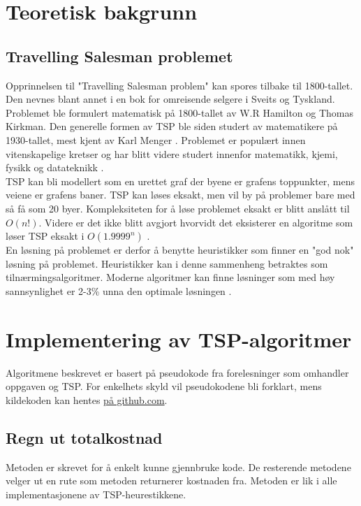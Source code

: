 \documentclass[12pt]{article}
\begin{document}
	
\section{Teoretisk bakgrunn}
\subsection{Travelling Salesman problemet}
		Opprinnelsen til "Travelling Salesman problem" kan spores tilbake til 1800-tallet. 
		Den nevnes blant annet i en bok for omreisende selgere i Sveits og Tyskland. Problemet ble formulert matematisk på 1800-tallet av W.R Hamilton og Thomas Kirkman. 
		Den generelle formen av TSP ble siden studert av matematikere på 1930-tallet, mest kjent av Karl Menger \cite{biggs1976graph}. Problemet er populært innen vitenskapelige kretser og har blitt videre studert innenfor matematikk, kjemi, fysikk og datateknikk \cite{lawler1985traveling}. \\
		
		TSP kan bli modellert som en urettet graf der byene er grafens toppunkter, mens veiene
		er grafens baner. TSP kan løses eksakt, men vil by på problemer bare med så få som 20 byer. Kompleksiteten for å løse problemet eksakt er blitt anslått til $O(n!)$. Videre er det ikke blitt avgjort hvorvidt det eksisterer en algoritme som løser TSP eksakt i $O(1.9999^n)$ \cite{woeginger2003exact}. \\
		
		En løsning på problemet er derfor å benytte heuristikker som finner en "god nok" løsning på problemet. Heuristikker kan i denne sammenheng betraktes som tilnærmingsalgoritmer. Moderne algoritmer kan finne løsninger som med høy sannsynlighet er 2-3\% unna den optimale løsningen \cite{rego2011traveling}.

\section{Implementering av TSP-algoritmer}
		Algoritmene beskrevet er basert på pseudokode fra forelesninger som omhandler oppgaven og TSP. For enkelhets skyld vil pseudokodene bli forklart, mens kildekoden kan hentes \href{https://github.com/martgra/DA-OPT3900-OBLIG1}{på github.com}. 
	\subsection{Regn ut totalkostnad}
		Metoden er skrevet for å enkelt kunne gjennbruke kode. De resterende metodene velger ut en rute som metoden
		returnerer kostnaden fra. Metoden er lik i alle implementasjonene av TSP-heurestikkene. 
\end{document}
